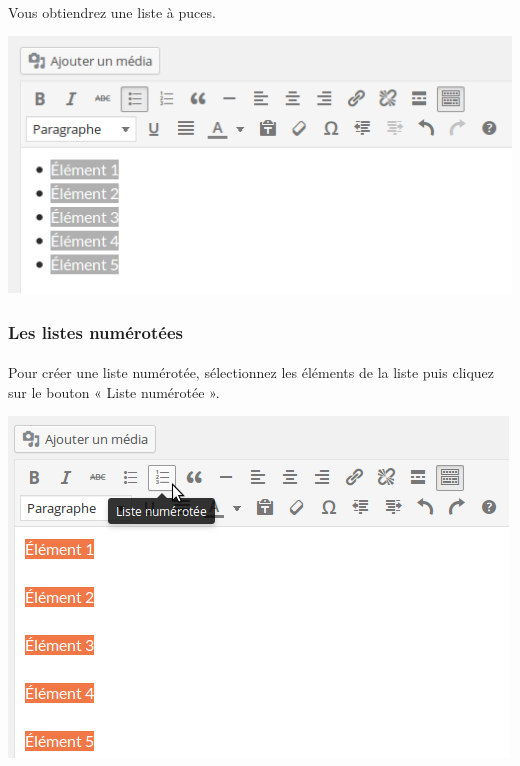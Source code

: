 \documentclass[10pt,a4paper]{article}
\begin{document}
\paragraph{}Vous obtiendrez une liste à puces.
\begin{center}
\includegraphics[scale=0.35]{img/0074.png}
\end{center}
\subsubsection{Les listes numérotées}
\paragraph{}Pour créer une liste numérotée, sélectionnez les éléments de la liste puis cliquez sur le bouton « Liste numérotée ».
\begin{center}
\includegraphics[scale=0.35]{img/0075.png}
\end{center}
\end{document}
